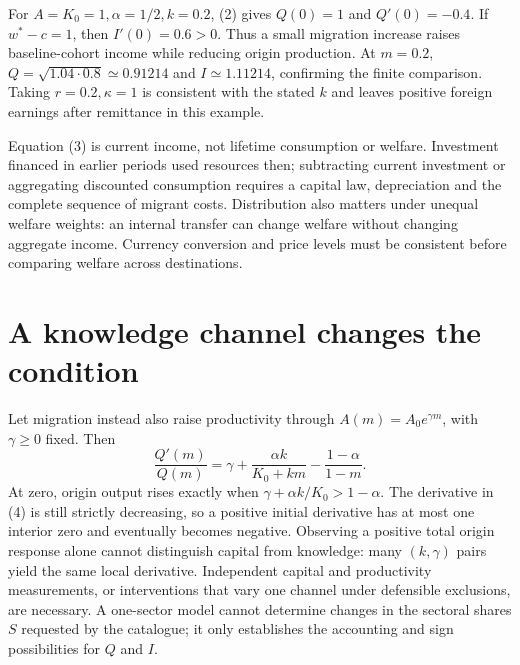 \documentclass[11pt,a4paper]{article}
\begin{document}
For $A=K_0=1,\alpha=1/2,k=0.2$, (2) gives $Q(0)=1$ and $Q'(0)=-0.4$. If $w^*-c=1$, then $I'(0)=0.6>0$. Thus a small migration increase raises baseline-cohort income while reducing origin production. At $m=0.2$, $Q=\sqrt{1.04\cdot0.8}\simeq0.91214$ and $I\simeq1.11214$, confirming the finite comparison. Taking $r=0.2,\kappa=1$ is consistent with the stated $k$ and leaves positive foreign earnings after remittance in this example.

Equation (3) is current income, not lifetime consumption or welfare. Investment financed in earlier periods used resources then; subtracting current investment or aggregating discounted consumption requires a capital law, depreciation and the complete sequence of migrant costs. Distribution also matters under unequal welfare weights: an internal transfer can change welfare without changing aggregate income. Currency conversion and price levels must be consistent before comparing welfare across destinations.

\section{A knowledge channel changes the condition}
Let migration instead also raise productivity through $A(m)=A_0e^{\gamma m}$, with $\gamma\ge0$ fixed. Then
\[
 \frac{Q'(m)}{Q(m)}
       =\gamma+\frac{\alpha k}{K_0+km}
                       -\frac{1-\alpha}{1-m}.        \tag{4}
\]
At zero, origin output rises exactly when
$\gamma+\alpha k/K_0>1-\alpha$.
The derivative in (4) is still strictly decreasing, so a positive initial derivative has at most one interior zero and eventually becomes negative. Observing a positive total origin response alone cannot distinguish capital from knowledge: many $(k,\gamma)$ pairs yield the same local derivative. Independent capital and productivity measurements, or interventions that vary one channel under defensible exclusions, are necessary. A one-sector model cannot determine changes in the sectoral shares $S$ requested by the catalogue; it only establishes the accounting and sign possibilities for $Q$ and $I$.
\end{document}
